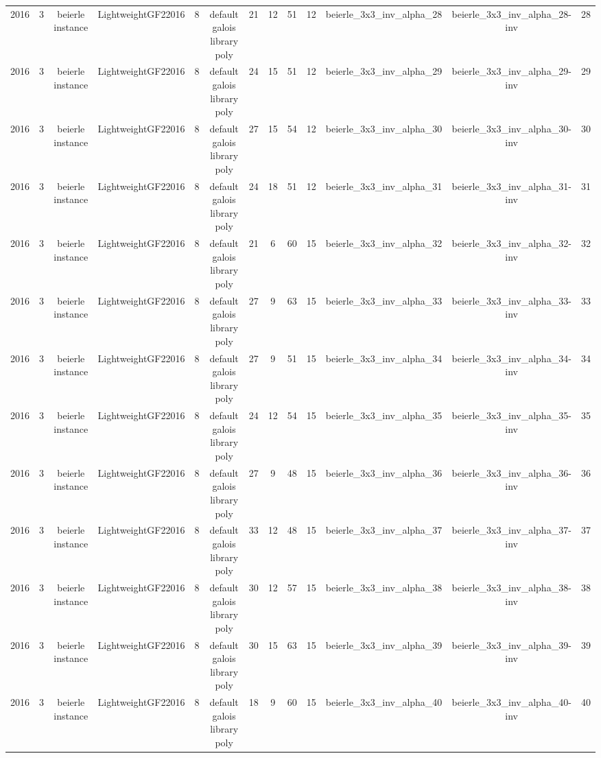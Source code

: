 \begin{tabular}{c c c c c c c c c c c c c}
2016 & 3 & beierle instance & LightweightGF22016 & 8 & default galois library poly & 21 & 12 & 51 & 12 & beierle_3x3_inv_alpha_28 & beierle_3x3_inv_alpha_28-inv & 28 \\
2016 & 3 & beierle instance & LightweightGF22016 & 8 & default galois library poly & 24 & 15 & 51 & 12 & beierle_3x3_inv_alpha_29 & beierle_3x3_inv_alpha_29-inv & 29 \\
2016 & 3 & beierle instance & LightweightGF22016 & 8 & default galois library poly & 27 & 15 & 54 & 12 & beierle_3x3_inv_alpha_30 & beierle_3x3_inv_alpha_30-inv & 30 \\
2016 & 3 & beierle instance & LightweightGF22016 & 8 & default galois library poly & 24 & 18 & 51 & 12 & beierle_3x3_inv_alpha_31 & beierle_3x3_inv_alpha_31-inv & 31 \\
2016 & 3 & beierle instance & LightweightGF22016 & 8 & default galois library poly & 21 & 6 & 60 & 15 & beierle_3x3_inv_alpha_32 & beierle_3x3_inv_alpha_32-inv & 32 \\
2016 & 3 & beierle instance & LightweightGF22016 & 8 & default galois library poly & 27 & 9 & 63 & 15 & beierle_3x3_inv_alpha_33 & beierle_3x3_inv_alpha_33-inv & 33 \\
2016 & 3 & beierle instance & LightweightGF22016 & 8 & default galois library poly & 27 & 9 & 51 & 15 & beierle_3x3_inv_alpha_34 & beierle_3x3_inv_alpha_34-inv & 34 \\
2016 & 3 & beierle instance & LightweightGF22016 & 8 & default galois library poly & 24 & 12 & 54 & 15 & beierle_3x3_inv_alpha_35 & beierle_3x3_inv_alpha_35-inv & 35 \\
2016 & 3 & beierle instance & LightweightGF22016 & 8 & default galois library poly & 27 & 9 & 48 & 15 & beierle_3x3_inv_alpha_36 & beierle_3x3_inv_alpha_36-inv & 36 \\
2016 & 3 & beierle instance & LightweightGF22016 & 8 & default galois library poly & 33 & 12 & 48 & 15 & beierle_3x3_inv_alpha_37 & beierle_3x3_inv_alpha_37-inv & 37 \\
2016 & 3 & beierle instance & LightweightGF22016 & 8 & default galois library poly & 30 & 12 & 57 & 15 & beierle_3x3_inv_alpha_38 & beierle_3x3_inv_alpha_38-inv & 38 \\
2016 & 3 & beierle instance & LightweightGF22016 & 8 & default galois library poly & 30 & 15 & 63 & 15 & beierle_3x3_inv_alpha_39 & beierle_3x3_inv_alpha_39-inv & 39 \\
2016 & 3 & beierle instance & LightweightGF22016 & 8 & default galois library poly & 18 & 9 & 60 & 15 & beierle_3x3_inv_alpha_40 & beierle_3x3_inv_alpha_40-inv & 40 \\

\end{tabular}
